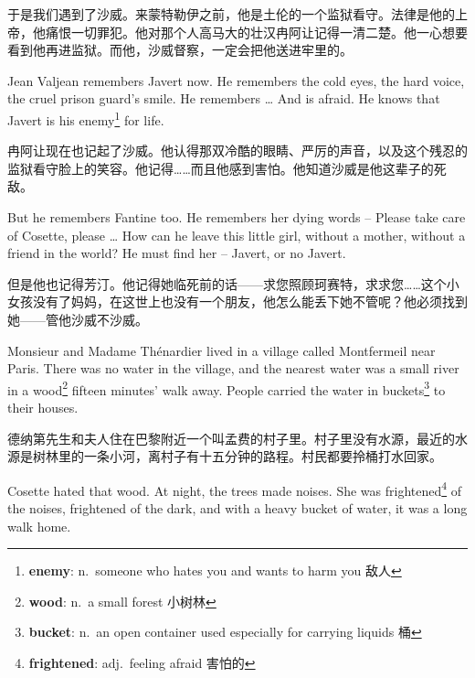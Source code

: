 \documentclass[fontset=ubuntu, zihao=5]{ctexart}
\begin{document}
\begin{paracol}{2}
  \switchcolumn

  于是我们遇到了沙威。来蒙特勒伊之前，他是土伦的一个监狱看守。法律是他的上帝，他痛恨一切罪犯。他对那个人高马大的壮汉冉阿让记得一清二楚。他一心想要看到他再进监狱。而他，沙威督察，一定会把他送进牢里的。

  \switchcolumn*

  Jean Valjean remembers Javert now. He remembers the cold eyes, the hard voice, the cruel prison guard's smile. He remembers \ldots{} And is afraid. He knows that Javert is his enemy\footnote{\textbf{enemy}: n. someone who hates you and wants to harm you 敌人}
 for life.

  \switchcolumn

  冉阿让现在也记起了沙威。他认得那双冷酷的眼睛、严厉的声音，以及这个残忍的监狱看守脸上的笑容。他记得……而且他感到害怕。他知道沙威是他这辈子的死敌。

  \switchcolumn*

  But he remembers Fantine too. He remembers her dying words – Please take care of Cosette, please \ldots{} How can he leave this little girl, without a mother, without a friend in the world? He must find her – Javert, or no Javert.

  \switchcolumn

  但是他也记得芳汀。他记得她临死前的话——求您照顾珂赛特，求求您……这个小女孩没有了妈妈，在这世上也没有一个朋友，他怎么能丢下她不管呢？他必须找到她——管他沙威不沙威。


  \switchcolumn*

  \sectionbreak

  Monsieur and Madame Thénardier lived in a village called Montfermeil near Paris. There was no water in the village, and the nearest water was a small river in a wood\footnote{\textbf{wood}: n. a small forest 小树林}
 fifteen minutes' walk away. People carried the water in buckets\footnote{\textbf{bucket}: n. an open container used especially for carrying liquids 桶}
 to their houses.

  \switchcolumn

  \sectionbreak

  德纳第先生和夫人住在巴黎附近一个叫孟费的村子里。村子里没有水源，最近的水源是树林里的一条小河，离村子有十五分钟的路程。村民都要拎桶打水回家。

  \switchcolumn*

  Cosette hated that wood. At night, the trees made noises. She was frightened\footnote{\textbf{frightened}: adj. feeling afraid 害怕的}
 of the noises, frightened of the dark, and with a heavy bucket of water, it was a long walk home.


\end{paracol}
\end{document}
